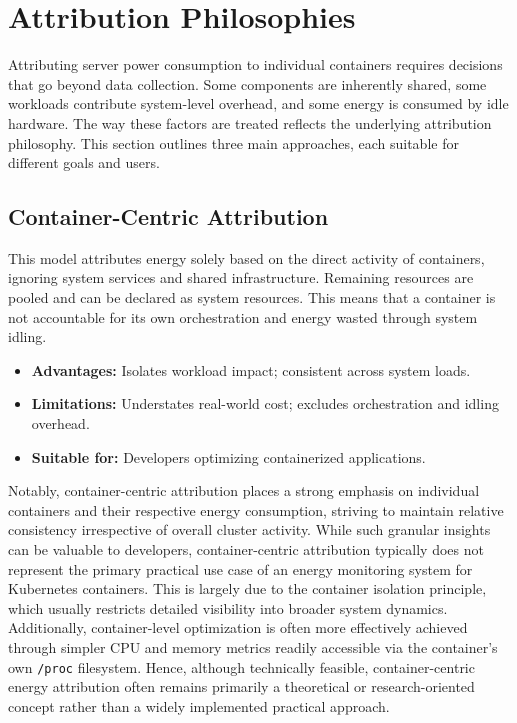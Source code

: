 \section{Attribution Philosophies}
\label{sec:attribution-philosophies}

Attributing server power consumption to individual containers requires decisions that go beyond data collection. Some components are inherently shared, some workloads contribute system-level overhead, and some energy is consumed by idle hardware. The way these factors are treated reflects the underlying attribution philosophy. This section outlines three main approaches, each suitable for different goals and users.

\subsection{Container-Centric Attribution}
\label{sec:container-centric}

This model attributes energy solely based on the direct activity of containers, ignoring system services and shared infrastructure. Remaining resources are pooled and can be declared as system resources. This means that a container is not accountable for its own orchestration and energy wasted through system idling.

\begin{itemize}
    \item \textbf{Advantages:} Isolates workload impact; consistent across system loads.
    \item \textbf{Limitations:} Understates real-world cost; excludes orchestration and idling overhead.
    \item \textbf{Suitable for:} Developers optimizing containerized applications.
\end{itemize}

Notably, container-centric attribution places a strong emphasis on individual containers and their respective energy consumption, striving to maintain relative consistency irrespective of overall cluster activity. While such granular insights can be valuable to developers, container-centric attribution typically does not represent the primary practical use case of an energy monitoring system for Kubernetes containers. This is largely due to the container isolation principle, which usually restricts detailed visibility into broader system dynamics. Additionally, container-level optimization is often more effectively achieved through simpler CPU and memory metrics readily accessible via the container’s own \texttt{/proc} filesystem. Hence, although technically feasible, container-centric energy attribution often remains primarily a theoretical or research-oriented concept rather than a widely implemented practical approach.

